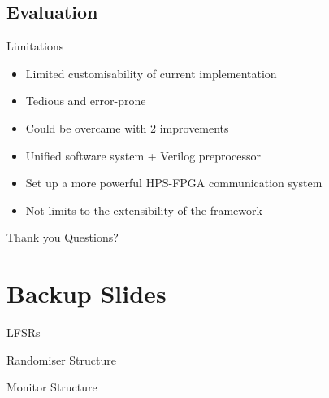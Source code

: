 \documentclass[t]{beamer}
\begin{document}
\subsection{Evaluation}
\begin{frame}{Limitations}
\begin{itemize}
  \item Limited customisability of current implementation
  \item Tedious and error-prone 
  \item Could be overcame with 2 improvements
  \item Unified software system + Verilog preprocessor
  \item Set up a more powerful HPS-FPGA communication system
  \item Not limits to the extensibility of the framework
\end{itemize}
\end{frame}

\begin{frame}{Thank you}
  Questions?
\end{frame}

\section{Backup Slides}
\begin{frame}{LFSRs}
  \begin{figure}[H]
    \centering
    
  \end{figure}
  \begin{figure}[H]
    \centering
    
  \end{figure}
\end{frame}

\begin{frame}{Randomiser Structure}
  \begin{figure}[H]
    \centering
    
  \end{figure}
  \begin{figure}[H]
    \centering
    
  \end{figure}
\end{frame}

\begin{frame}{Monitor Structure}
  \begin{figure}[H]
    \centering
    
  \end{figure}
  \begin{figure}[H]
    \centering
    
  \end{figure}
\end{frame}
\end{document}

